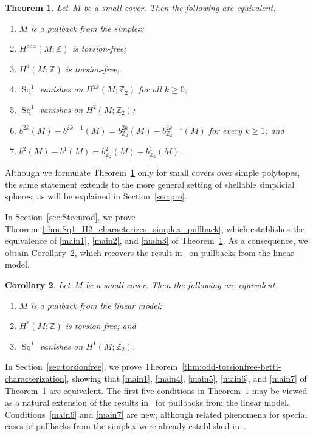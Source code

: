 \documentclass{amsart}
\newcommand{\Z}{\mathbb{Z}}
\DeclareMathOperator{\odd}{odd}
\DeclareMathOperator{\Sq}{Sq}
\theoremstyle{plain}
\newtheorem{theorem}{Theorem}[section]
\newtheorem{corollary}[theorem]{Corollary}
\numberwithin{equation}{section}
\theoremstyle{definition}
\theoremstyle{remark}
\begin{document}
\begin{theorem}\label{thm:main}
    Let~$M$ be a small cover.
    Then the following are equivalent.
    \begin{enumerate}
        \item\label{main1} $M$ is a pullback from the simplex;
        \item\label{main4} $H^{\odd}(M;\Z)$ is torsion-free;
        \item\label{main5} $H^3(M;\Z)$ is torsion-free;
        \item\label{main2} $\Sq^1$ vanishes on $H^{2k}(M;\Z_2)$ for all $k\geq 0$;
        \item\label{main3} $\Sq^1$ vanishes on $H^2(M;\Z_2)$;
        \item\label{main6} $b^{2k}(M)-b^{2k-1}(M) = b^{2k}_{\Z_2}(M)-b^{2k-1}_{\Z_2}(M)$ for every $k\ge 1$; and
        \item\label{main7} $b^2(M)-b^1(M) =b^2_{\Z_2}(M)-b^1_{\Z_2}(M)$.
    \end{enumerate}
\end{theorem}
Although we formulate Theorem~\ref{thm:main} only for small covers over simple polytopes, the same statement extends to the more general setting of shellable simplicial spheres, as will be explained in Section~\ref{sec:pre}.

In Section~\ref{sec:Steenrod}, we prove Theorem~\ref{thm:Sq1_H2_characterizes_simplex_pullback}, which establishes the equivalence of \eqref{main1}, \eqref{main2}, and \eqref{main3} of Theorem~\ref{thm:main}.
As a consequence, we obtain Corollary~\ref{cor:main}, which recovers the result in~\cite{Cai-Choi-Park2020} on pullbacks from the linear model.
\begin{corollary}\label{cor:main}
    Let~$M$ be a small cover.
    Then the following are equivalent.
    \begin{enumerate}
        \item $M$ is a pullback from the linear model;
        \item $H^\ast(M;\Z)$ is torsion-free; and
        \item $\Sq^1$ vanishes on $H^1(M;\Z_2)$.
    \end{enumerate}
\end{corollary}
In Section~\ref{sec:torsionfree}, we prove Theorem~\ref{thm:odd-torsionfree-betti-characterization}, showing that \eqref{main1}, \eqref{main4}, \eqref{main5}, \eqref{main6}, and \eqref{main7} of Theorem~\ref{thm:main} are equivalent.
The first five conditions in Theorem~\ref{thm:main} may be viewed as a natural extension of the results in~\cite{Cai-Choi-Park2020} for pullbacks from the linear model.
Conditions~\eqref{main6} and \eqref{main7} are new, although related phenomena for special cases of pullbacks from the simplex were already established in~\cite[Corollary~7.3]{Choi-Yoon-Yu2026}.
\end{document}

